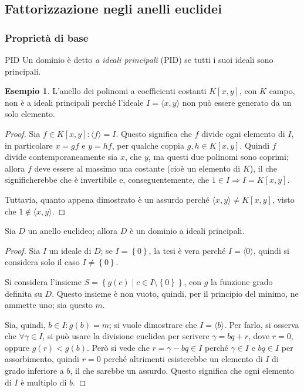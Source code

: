 \documentclass[11pt, a4paper]{scrartcl}
\theoremstyle{definition}
\newtheorem{esempio}{Esempio}
\numberwithin{esempio}{section}
\theoremstyle{definition}
\numberwithin{obs}{section}
\numberwithin{nota}{section}
\numberwithin{equation}{subsection}
\begin{document}
\subsection{Fattorizzazione negli anelli euclidei}
\subsubsection{Propriet\`a di base}
\begin{definizione}
	{PID}{}
	Un dominio \`e detto \textit{a ideali principali} (PID) se tutti i suoi ideali sono principali.
\end{definizione}
\begin{esempio}
	L'anello dei polinomi a coefficienti costanti $K[x,y]$, con $K$ campo, non \`e a ideali principali perch\'e l'ideale $I = \langle x,y \rangle$ non pu\`o essere generato da un solo elemento.
	\begin{proof}
		Sia $f \in K[x,y] : \langle f \rangle = I$.
		Questo significa che $f$ divide ogni elemento di $I$, in particolare $x = gf$ e $y = hf$, per qualche coppia $g,h \in K[x,y]$.
		Quindi $f$ divide contemporaneamente sia $x$, che $y$, ma questi due polinomi sono coprimi; allora $f$ deve essere al massimo una costante (cio\`e un elemento di $K$), il che significherebbe che \`e invertibile e, conseguentemente, che $1 \in I \Rightarrow I = K[x,y]$.

		Tuttavia, quanto appena dimostrato \`e un assurdo perch\'e $\langle x,y \rangle \neq K[x,y]$, visto che $1 \not \in \langle x,y \rangle$.
	\end{proof}
\end{esempio}
\begin{teorema}
	{}{}
	Sia $D$ un anello euclideo; allora $D$ \`e un dominio a ideali principali.
	\begin{proof}
	Sia $I$ un ideale di $D$; se $I = \left\{ 0 \right\} $, la tesi \`e vera perch\'e $I = \langle 0 \rangle$, quindi si considera solo il caso $I\neq \left\{ 0 \right\} $.	

	Si considera l'insieme $S = \left\{ g(c)  \mid c \in I \setminus\left\{ 0 \right\}  \right\} $, con $g$ la funzione grado definita su $D$.
	Questo insieme \`e non vuoto, quindi, per il principio del minimo, ne ammette uno; sia questo $m$.

	Sia, quindi, $b \in I : g(b) = m$; si vuole dimostrare che $I = \langle b \rangle$. 
	Per farlo, si osserva che $\forall \gamma \in I$, si pu\`o usare la divisione euclidea per scrivere $\gamma =  bq + r$, dove $r = 0$, oppure $g(r)<g(b)$.
	Per\`o si vede che $r= \gamma-bq \in I$ perch\'e $\gamma\in I$ e $bq \in I$ per assorbimento, quindi $r = 0$ perch\'e altrimenti esisterebbe un elemento di $I$ di grado inferiore a $b$, il che sarebbe un assurdo.
	Questo significa che ogni elemento di $I$ \`e multiplo di $b$.
	\end{proof}
\end{teorema}
\end{document}
